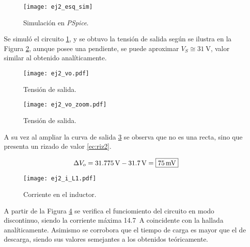 \begin{figure}[H]
	\centering
	\texttt{[image: ej2\_esq\_sim]}
	\caption{Simulación en \textit{PSpice}.}
	\label{fig:ej2_esq_sim}
\end{figure}

Se simuló el circuito \ref{fig:ej2_esq_sim}, y se obtuvo la tensión de salida según se ilustra en la Figura \ref{fig:ej2_vo}, aunque posee una pendiente, se puede aproximar $V_S \cong \SI{31}{\volt}$, valor similar al obtenido analíticamente.

\begin{figure}[H]
	\centering
	\texttt{[image: ej2\_vo.pdf]}
	\caption{Tensión de salida.}
	\label{fig:ej2_vo}
\end{figure}


\begin{figure}[H]
	\centering
	\texttt{[image: ej2\_vo\_zoom.pdf]}
	\caption{Tensión de salida.}
	\label{fig:ej2_vo_zoom}
\end{figure}

A su vez al ampliar la curva de salida \ref{fig:ej2_vo_zoom} se observa que no es una recta, sino que presenta un rizado de valor \eqref{ec:riz2}.

\begin{equation}
	\centering
	\Delta V_o = \SI{31.775}{\volt} - \SI{31.7}{\volt} = \boxed{\SI{75}{\milli\volt}}
	\label{ec:riz2}
\end{equation}

\begin{figure}[H]
	\centering
	\texttt{[image: ej2\_i\_L1.pdf]}
	\caption{Corriente en el inductor.}
	\label{fig:ej2_i_L1}
\end{figure}


A partir de la Figura \ref{fig:ej2_i_L1} se verifica el funciomiento del circuito en modo discontinuo, siendo la corriente máxima \SI{14.7}{\ampere} coincidente con la hallada analíticamente. Asimismo se corrobora que el tiempo de carga es mayor que el de descarga, siendo sus valores semejantes a los obtenidos teóricamente.

